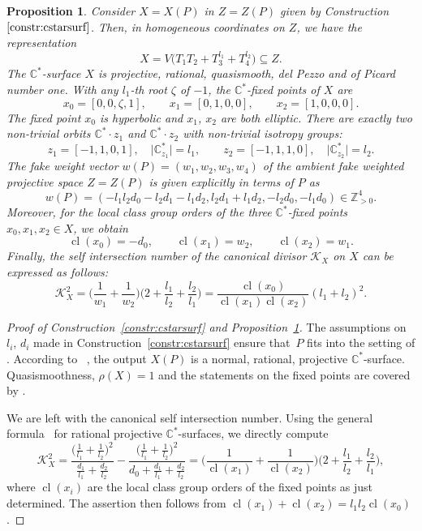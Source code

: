 \documentclass[pdftex]{sigma}
\newtheorem{prop}[thm]{Proposition}
\theoremstyle{definition}
\def\CC{{\mathbb C}}
\def\ZZ{{\mathbb Z}}
\DeclareMathOperator{\cl}{cl}
\begin{document}
\begin{prop}
\label{prop:cstarsurf}
Consider $X=X(P)$ in $Z=Z(P)$ given by
Construction~$\ref{constr:cstarsurf}$.
Then, in homogeneous coordinates on $Z$,
we have the representation
\[
X
 =
V\bigl(T_1T_2 + T_3^{l_1} + T_4^{l_2}\bigr)
 \subseteq
Z.
\]
The $\CC^*$-surface $X$ is projective, rational,
quasismooth, del Pezzo and of Picard number one.
With any $l_1$-th root $\zeta$ of $-1$, the $\CC^*$-fixed
points of $X$ are
\[
x_0 = [0,0,\zeta,1],
\qquad
x_1 = [0,1,0,0],
\qquad
x_2 = [1,0,0,0].
\]
The fixed point $x_0$ is hyperbolic and $x_1$, $x_2$ are both
elliptic.
There are exactly two non-trivial orbits $\CC^* \cdot z_1$
and $\CC^* \cdot z_2$ with non-trivial isotropy groups:
\[
z_1 = [-1,1,0,1], \quad
\vert \CC^*_{z_1} \vert = l_1,
\qquad
z_2 = [-1,1,1,0], \quad
\vert \CC^*_{z_2} \vert = l_2.
\]
The fake weight vector $w(P) =(w_1,w_2,w_3,w_4)$
of the ambient fake weighted projective space $Z = Z(P)$
is given explicitly in terms of $P$ as
\[
w(P)
 =
(-l_1l_2d_0 - l_2d_1 - l_1d_2, l_2d_1 + l_1d_2, - l_2d_0, -l_1d_0)
 \in
\ZZ_{>0}^4.
\]
Moreover, for the local class group orders of the three
$\CC^*$-fixed points $x_0,x_1,x_2 \in X$, we obtain
\[
\cl(x_0) = -d_0,
\qquad
\cl(x_1) = w_2,
\qquad
\cl(x_2) = w_1.
\]
Finally, the self intersection number of the canonical
divisor $\mathcal{K}_X$ on $X$ can be expressed as
follows:
\[
\mathcal{K}_X^2
 =
\biggl( \frac{1}{w_1} + \frac{1}{w_2} \biggr)
\biggl(2 + \frac{l_1}{l_2} + \frac{l_2}{l_1} \biggr)
 =
\frac{\cl(x_0)}{\cl(x_1)\cl(x_2)} (l_1+l_2)^2.
\]
\end{prop}


\begin{proof}[Proof of Construction~\ref{constr:cstarsurf}
and Proposition~\ref{prop:cstarsurf}]
The assumptions on $l_i$, $d_i$ made in
Construction~\ref{constr:cstarsurf}
ensure that~$P$ fits into the setting of
\cite[Construction~4.2]{HaHaHaSp}.
According to~ \cite[Proposition~4.5]{HaHaHaSp}, the
output $X(P)$ is a normal, rational,
projective $\CC^*$-surface.
Quasismoothness, $\rho(X)=1$ and the
statements on the fixed points are covered
by \cite[Propositions~4.9, 4.15 and~5.1]{HaHaHaSp}.

We are left with the canonical self intersection number.
Using the general formula~\cite[Proposition~7.9]{HaHaSp}
for rational projective $\CC^*$-surfaces, we directly
compute
\[
\mathcal{K}_X^2
 =
\frac{\bigl(\frac{1}{l_1}+\frac{1}{l_2}\bigr)^2}{\frac{d_1}{l_1}+\frac{d_2}{l_2}}
 -
\frac{\bigl(\frac{1}{l_1}+\frac{1}{l_2}\bigr)^2}{d_0+\frac{d_1}{l_1}+\frac{d_2}{l_2}}
 =
\biggl(
\frac{1}{\cl(x_1)}
 +
\frac{1}{\cl(x_2)}
\biggr)
\biggl(2+\frac{l_1}{l_2}+\frac{l_2}{l_1}\biggr),
\]
where $\cl(x_i)$ are the local class group orders
of the fixed points as just determined.
The assertion then follows from
$\cl(x_1)+\cl(x_2)= l_1l_2\cl(x_0)$.
\end{proof}
\end{document}
